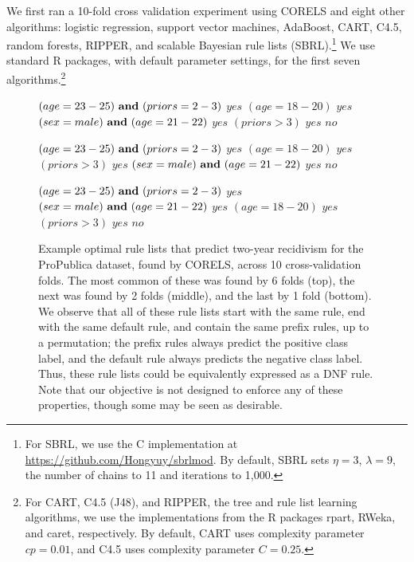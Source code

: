 We first ran a 10-fold cross validation experiment using CORELS
and eight other algorithms:
logistic regression, support vector machines, AdaBoost, CART, C4.5,
random forests, RIPPER, and scalable Bayesian rule lists (SBRL).\footnote{For
SBRL, we use the C implementation at \url{https://github.com/Hongyuy/sbrlmod}.
By default, SBRL sets ${\eta = 3}$, ${\lambda = 9}$,
the number of chains to 11 and iterations to 1,000.}
%
We use standard R packages, with default parameter settings,
for the first seven algorithms.\footnote{For CART, C4.5 (J48), and RIPPER,
\ie the tree and rule list learning algorithms, we use the implementations
from the R packages rpart, RWeka, and caret, respectively.
%
By default, CART uses complexity parameter ${cp = 0.01}$,
and C4.5 uses complexity parameter ${C = 0.25}$.
}

\begin{figure}[t]
\begin{algorithmic}
\State \bif $(age = 23-25) {\bf ~and~} (priors = 2-3)$ \bthen $yes$
\State \belif $(age = 18-20)$ \bthen $yes$
\State \belif $(sex = male) {\bf ~and~} (age = 21-22)$ \bthen $yes$
\State \belif $(priors > 3)$ \bthen $yes$
\State \belse $no$
\end{algorithmic}
\vspace{1mm}
\begin{algorithmic}
\State \bif $(age = 23-25) {\bf ~and~} (priors = 2-3)$ \bthen $yes$
\State \belif $(age = 18-20)$ \bthen $yes$
\State \belif $(priors > 3)$ \bthen $yes$
\State \belif $(sex = male) {\bf ~and~} (age = 21-22)$ \bthen $yes$
\State \belse $no$
\end{algorithmic}
\vspace{1mm}
\begin{algorithmic}
\State \bif $(age = 23-25) {\bf ~and~} (priors = 2-3)$ \bthen $yes$
\State \belif $(sex = male) {\bf ~and~} (age = 21-22)$ \bthen $yes$
\State \belif $(age = 18-20)$ \bthen $yes$
\State \belif $(priors > 3)$ \bthen $yes$
\State \belse $no$
\end{algorithmic}
\caption{Example optimal rule lists that predict two-year recidivism for the
ProPublica dataset, found by CORELS, across 10 cross-validation folds.
%
The most common of these was found by 6 folds (top),
the next was found by 2 folds (middle), and the last by 1 fold (bottom).
%
We observe that all of these rule lists start with the same rule,
end with the same default rule, and contain the same prefix rules, up to a permutation;
the prefix rules always predict the positive class label,
and the default rule always predicts the negative class label.
%
Thus, these rule lists could be equivalently expressed as a DNF rule.
%
Note that our objective is not designed to enforce any of these properties,
though some may be seen as desirable.
}
\label{fig:recidivism-all-folds}
\end{figure}

